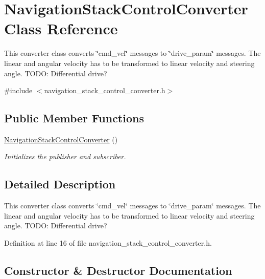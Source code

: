 \hypertarget{class_navigation_stack_control_converter}{}\section{Navigation\+Stack\+Control\+Converter Class Reference}
\label{class_navigation_stack_control_converter}


This converter class converts \char`\"{}cmd\+\_\+vel\char`\"{} messages to \char`\"{}drive\+\_\+param\char`\"{} messages. The linear and angular velocity has to be transformed to linear velocity and steering angle. T\+O\+DO\+: Differential drive?  




{\ttfamily \#include $<$navigation\+\_\+stack\+\_\+control\+\_\+converter.\+h$>$}

\subsection*{Public Member Functions}
\begin{DoxyCompactItemize}
\item 
\hyperlink{class_navigation_stack_control_converter_aaa467e7f68ffb78c9778cdeedc972fac}{Navigation\+Stack\+Control\+Converter} ()
\begin{DoxyCompactList}\small\item\em Initializes the publisher and subscriber. \end{DoxyCompactList}\end{DoxyCompactItemize}


\subsection{Detailed Description}
This converter class converts \char`\"{}cmd\+\_\+vel\char`\"{} messages to \char`\"{}drive\+\_\+param\char`\"{} messages. The linear and angular velocity has to be transformed to linear velocity and steering angle. T\+O\+DO\+: Differential drive? 

Definition at line 16 of file navigation\+\_\+stack\+\_\+control\+\_\+converter.\+h.



\subsection{Constructor \& Destructor Documentation}
